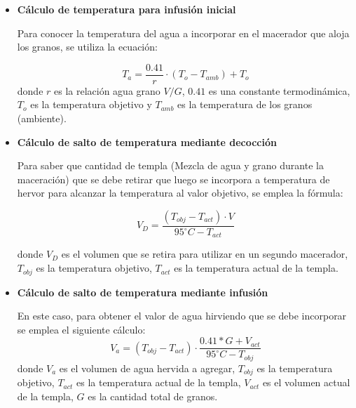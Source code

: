             \begin{itemize}
                \item \textbf{Cálculo de temperatura para infusión inicial}
                \par Para conocer la temperatura del agua a incorporar en el macerador que aloja los granos, se utiliza la ecuación:
                
                \begin{equation}
                    T_a = \frac{0.41}{r} \cdot (T_o - T_{amb}) + T_o
                    \label{EcuacionInfusion}
                \end{equation}
                donde $r$ es la relación agua grano $V/G$, $0.41$ es una constante termodinámica, $T_o$ es la temperatura objetivo y $T_{amb}$ es la temperatura de los granos (ambiente). 
                
                \item \textbf{Cálculo de salto de temperatura mediante decocción}
                \par Para saber que cantidad de templa (Mezcla de agua y grano durante la maceración) que se debe retirar que luego se incorpora a temperatura de hervor para alcanzar la temperatura al valor objetivo, se emplea la fórmula:
                
                \begin{equation}
                    V_D = \frac{(T_{obj} - T_{act}) \cdot V }{95^{\circ}C - T_{act}}
                    \label{EcuacionDecoccion}
                \end{equation}
                
                \par donde $V_D$ es el volumen que se retira para utilizar en un segundo macerador, $T_{obj}$ es la temperatura objetivo, $T_{act}$ es la temperatura actual de la templa. 
                
                \item \textbf{Cálculo de salto de temperatura mediante infusión}
                \par En este caso, para obtener el valor de agua hirviendo que se debe incorporar se emplea el siguiente cálculo:
                \begin{equation}
                    V_a = (T_{obj} - T_{act}) \cdot \frac{0.41 * G + V_{act}}{95^{\circ}C - T_{obj}}
                \label{EcuacionEscalon}
                \end{equation}
                donde $V_a$ es el volumen de agua hervida a agregar, $T_{obj}$ es la temperatura objetivo, $T_{act}$ es la temperatura actual de la templa, $V_{act}$ es el volumen actual de la templa, $G$ es la cantidad total de granos.
                

\end{itemize}
